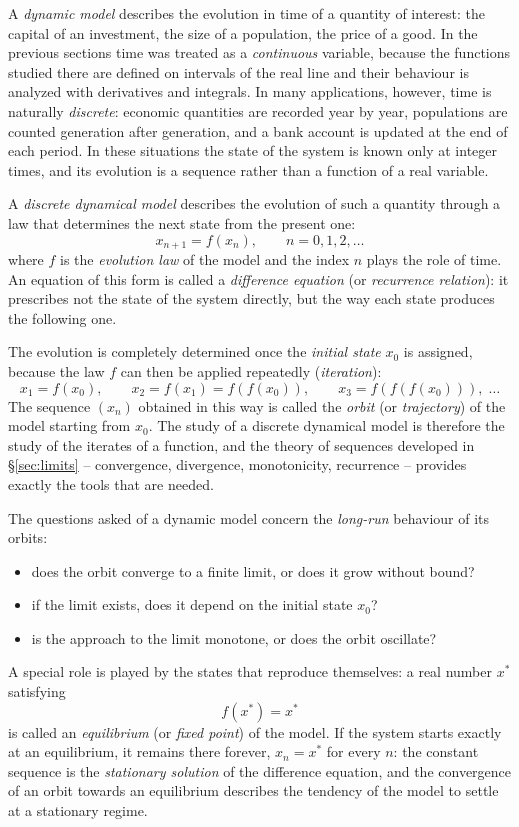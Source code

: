 \documentclass[11pt,a4paper]{article}
\theoremstyle{definition} \newtheorem{definition}{Definition} \theoremstyle{plain} \newtheorem{theorem}{Theorem}
\begin{document}
A \emph{dynamic model} describes the evolution in time of a quantity of
interest: the capital of an investment, the size of a population, the price
of a good. In the previous sections time was treated as a
\emph{continuous} variable, because the functions studied there are defined
on intervals of the real line and their behaviour is analyzed with
derivatives and integrals. In many applications, however, time is naturally
\emph{discrete}: economic quantities are recorded year by year, populations
are counted generation after generation, and a bank account is updated at
the end of each period. In these situations the state of the system is
known only at integer times, and its evolution is a sequence rather than a
function of a real variable.

A \emph{discrete dynamical model} describes the evolution of such a
quantity through a law that determines the next state from the present one:
\[ x_{n+1} = f(x_n), \qquad n = 0, 1, 2, \ldots \]
where $f$ is the \emph{evolution law} of the model and the index $n$ plays
the role of time. An equation of this form is called a \emph{difference
equation} (or \emph{recurrence relation}): it prescribes not the state of
the system directly, but the way each state produces the following one.

The evolution is completely determined once the \emph{initial state} $x_0$
is assigned, because the law $f$ can then be applied repeatedly
(\emph{iteration}):
\[ x_1 = f(x_0), \qquad
   x_2 = f(x_1) = f(f(x_0)), \qquad
   x_3 = f(f(f(x_0))), \;\ldots \]
The sequence $(x_n)$ obtained in this way is called the \emph{orbit} (or
\emph{trajectory}) of the model starting from $x_0$. The study of a
discrete dynamical model is therefore the study of the iterates of a
function, and the theory of sequences developed in \S\ref{sec:limits} -- convergence,
divergence, monotonicity, recurrence -- provides exactly the tools that are
needed.

The questions asked of a dynamic model concern the \emph{long-run}
behaviour of its orbits:
\begin{itemize}
\item does the orbit converge to a finite limit, or does it grow without
bound?
\item if the limit exists, does it depend on the initial state $x_0$?
\item is the approach to the limit monotone, or does the orbit oscillate?
\end{itemize}
A special role is played by the states that reproduce themselves: a real
number $x^*$ satisfying
\[ f(x^*) = x^* \]
is called an \emph{equilibrium} (or \emph{fixed point}) of the model. If
the system starts exactly at an equilibrium, it remains there forever,
$x_n = x^*$ for every $n$: the constant sequence is the \emph{stationary
solution} of the difference equation, and the convergence of an orbit
towards an equilibrium describes the tendency of the model to settle at a
stationary regime.
\end{document}
